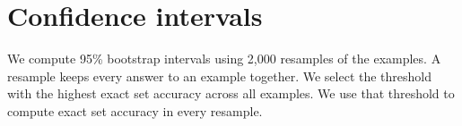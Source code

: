 \section{Confidence intervals}
\label{app:intervals}
We compute 95\% bootstrap intervals using 2,000 resamples of the examples. A resample keeps every answer to an example together. We select the threshold with the highest exact set accuracy across all examples. We use that threshold to compute exact set accuracy in every resample.

\begin{table}[H]
\caption{The figures of Tables~\ref{tab:allocation}, \ref{tab:copies} and~\ref{tab:thresholds} with their 95\% intervals. \emph{Gap} and \emph{Gap of the copies} are in percentage points, and \emph{Ranked} and \emph{Below $1/n$} in percent. \emph{Below $1/n$, all lists} is the share of all lists with a correct choice below $1/n$, in percent.}
\label{tab:intervals}
\centering
\resizebox{\linewidth}{!}{}
\end{table}
